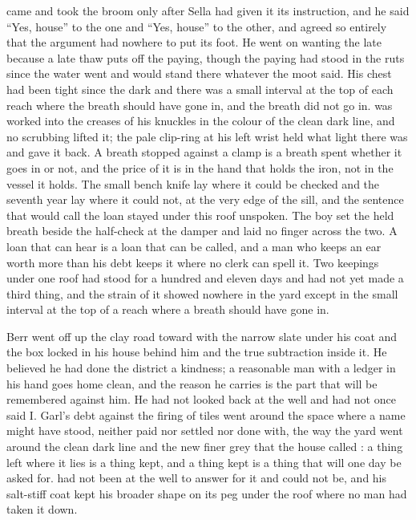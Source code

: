  came and took the broom only after Sella had given it its instruction, and he said “Yes, house” to the one and “Yes, house” to the other, and agreed so entirely that the argument had nowhere to put its foot. He went on wanting the late because a late thaw puts off the paying, though the paying had stood in the ruts since the water went and would stand there whatever the moot said. His chest had been tight since the dark and there was a small interval at the top of each reach where the breath should have gone in, and the breath did not go in.  was worked into the creases of his knuckles in the colour of the clean dark line, and no scrubbing lifted it; the pale clip-ring at his left wrist held what light there was and gave it back. A breath stopped against a clamp is a breath spent whether it goes in or not, and the price of it is in the hand that holds the iron, not in the vessel it holds. The small bench knife lay where it could be checked and the seventh year lay where it could not, at the very edge of the sill, and the sentence that would call the loan stayed under this roof unspoken. The boy set the held breath beside the half-check at the damper and laid no finger across the two. A loan that can hear is a loan that can be called, and a man who keeps an ear worth more than his debt keeps it where no clerk can spell it. Two keepings under one roof had stood for a hundred and eleven days and had not yet made a third thing, and the strain of it showed nowhere in the yard except in the small interval at the top of a reach where a breath should have gone in.

Berr went off up the clay road toward  with the narrow slate under his coat and the box locked in his house behind him and the true subtraction inside it. He believed he had done the district a kindness; a reasonable man with a ledger in his hand goes home clean, and the reason he carries is the part that will be remembered against him. He had not looked back at the well and had not once said I. Garl's debt against the firing of tiles went around the space where a name might have stood, neither paid nor settled nor done with, the way the yard went around the clean dark line and the new finer grey that the house called : a thing left where it lies is a thing kept, and a thing kept is a thing that will one day be asked for.  had not been at the well to answer for it and could not be, and his salt-stiff coat kept his broader shape on its peg under the roof where no man had taken it down.

